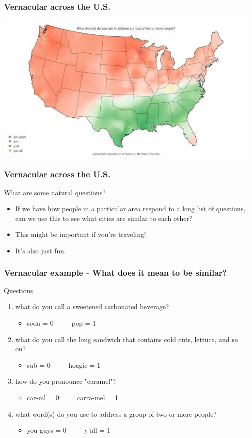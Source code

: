 \documentclass{beamer} %
\newcommand{\1}{\mathbb{1}}
\begin{document}
\begin{frame}[t]\frametitle{Vernacular across the U.S.}
\includegraphics[scale = 0.4]{./visualization/you_all.jpg}
\end{frame}

\begin{frame}[t]\frametitle{Vernacular across the U.S.}
What are some natural questions?
\begin{itemize}
	\item If we have how people in a particular area respond to a long list of questions, can we use this to see what cities are similar to each other?
	\item This might be important if you're traveling!
	\item It's also just fun. 
\end{itemize}
\end{frame}


\begin{frame}[t]\frametitle{Vernacular example - What does it mean to be similar?}
	Questions
	\begin{enumerate}
\item what do you call a sweetened carbonated beverage? 
	 	\begin{itemize}
	 		\item soda = 0 $\qquad$ pop = 1
	 	\end{itemize}
	 	\item what do you call the long sandwich that contains cold cuts, lettuce, and so on?
	 	\begin{itemize}
	 		\item sub = 0 $\qquad$ hoagie = 1
	 	\end{itemize}
	 	\item how do you pronounce "caramel"? 
	 	\begin{itemize}
	 		\item car-ml = 0 $\qquad$ carra-mel = 1
	 	\end{itemize}
	 	\item what word(s) do you use to address a group of two or more people?
	 	\begin{itemize}
	 		\item you guys = 0 $\qquad$ y'all = 1
	 	\end{itemize}
	 \end{enumerate} 
\end{frame}
\end{document}
